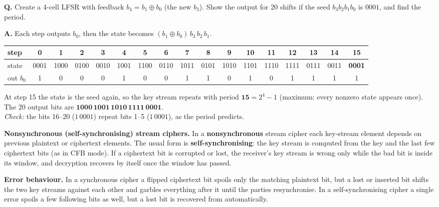 \begin{worked}
\textbf{Q.} Create a 4-cell LFSR with feedback $b_4 = b_1 \oplus b_0$ (the new $b_3$). Show the output for 20 shifts if the seed $b_3 b_2 b_1 b_0$ is $0001$, and find the period.

\textbf{A.} Each step outputs $b_0$, then the state becomes $(b_1 \oplus b_0)\, b_3\, b_2\, b_1$.
\begin{center}\scriptsize\setlength{\tabcolsep}{2.2pt}
\begin{tabular}{@{}l*{16}{c}@{}}
\toprule
step & 0&1&2&3&4&5&6&7&8&9&10&11&12&13&14&15\\
\midrule
state & 0001&1000&0100&0010&1001&1100&0110&1011&0101&1010&1101&1110&1111&0111&0011&\textbf{0001}\\
out $b_0$ & 1&0&0&0&1&0&0&1&1&0&1&0&1&1&1&1\\
\bottomrule
\end{tabular}
\end{center}
At step 15 the state is the seed again, so the key stream repeats with period $\mathbf{15} = 2^4 - 1$ (maximum: every nonzero state appears once). The 20 output bits are $\mathbf{1000\,1001\,1010\,1111\,0001}$.\\
\emph{Check:} the bits 16--20 ($1\,0001$) repeat bits 1--5 ($1\,0001$), as the period predicts.
\end{worked}

\textbf{Nonsynchronous (self-synchronising) stream ciphers.} In a \textbf{nonsynchronous} stream cipher each key-stream element depends on previous plaintext or ciphertext elements. The usual form is \textbf{self-synchronising}: the key stream is computed from the key and the last few ciphertext bits (as in CFB mode). If a ciphertext bit is corrupted or lost, the receiver's key stream is wrong only while the bad bit is inside its window, and decryption recovers by itself once the window has passed.

\textbf{Error behaviour.} In a synchronous cipher a flipped ciphertext bit spoils only the matching plaintext bit, but a lost or inserted bit shifts the two key streams against each other and garbles everything after it until the parties resynchronise. In a self-synchronising cipher a single error spoils a few following bits as well, but a lost bit is recovered from automatically.

